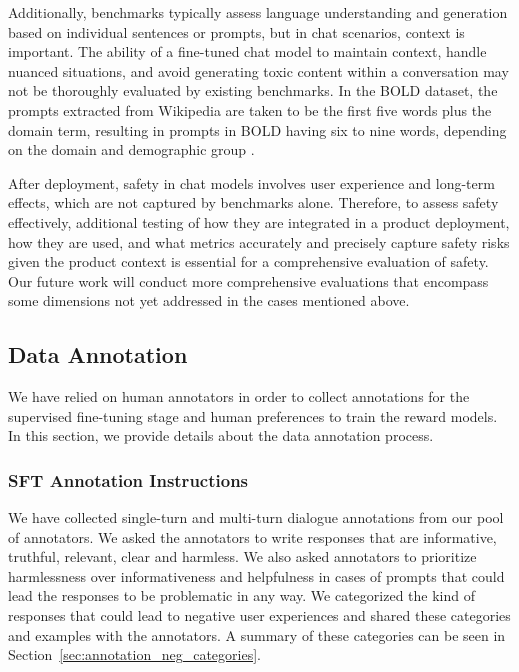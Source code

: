 \documentclass{article}
\begin{document}
Additionally, benchmarks typically assess language understanding and generation based on individual sentences or prompts, but in chat scenarios, context is important. The ability of a fine-tuned chat model to maintain context, handle nuanced situations, and avoid generating toxic content within a conversation may not be thoroughly evaluated by existing benchmarks. 
In the BOLD dataset, the prompts extracted from Wikipedia are taken to be the first five words plus the domain term, resulting in prompts in BOLD having six to nine words, depending on the domain and demographic group \citep{dhamala2021bold}. 

After deployment, safety in chat models involves user experience and long-term effects, which are not captured by benchmarks alone. Therefore, to assess safety effectively, additional testing of how they are integrated in a product deployment, how they are used, and what metrics accurately and precisely capture safety risks given the product context is essential for a comprehensive evaluation of safety. Our future work will conduct more comprehensive evaluations that encompass some dimensions not yet addressed in the cases mentioned above. 

\subsection{Data Annotation}
\label{sec:data_annotation}

We have relied on human annotators in order to collect annotations for the supervised fine-tuning stage and human preferences to train the reward models. In this section, we provide details about the data annotation process.

\subsubsection{SFT Annotation Instructions}

We have collected single-turn and multi-turn dialogue annotations from our pool of annotators. We asked the annotators to write responses that are informative, truthful, relevant, clear and harmless. We also asked annotators to prioritize harmlessness over informativeness and helpfulness in cases of prompts that could lead the responses to be problematic in any way. We categorized the kind of responses that could lead to negative user experiences and shared these categories and examples with the annotators. A summary of these categories can be seen in Section~\ref{sec:annotation_neg_categories}.
\end{document}
